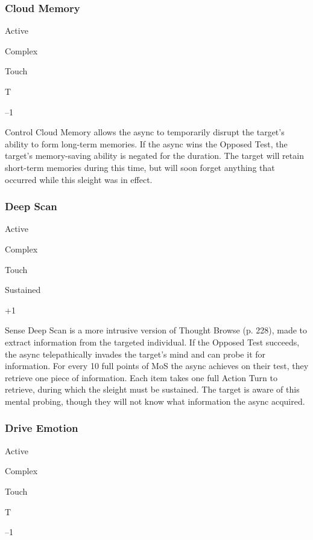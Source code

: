 \subsubsection{Cloud Memory}


  

Active

   Complex

 Touch

   T

   –1

  

Control
Cloud Memory allows the async to temporarily disrupt
the target's ability to form long-term memories. If
the async wins the Opposed Test, the target's memory-saving
ability is negated for the duration. The target
will retain short-term memories during this time, but 
will soon forget anything that occurred while this 
sleight was in effect.

\subsubsection{Deep Scan}


  

Active

   Complex

 Touch

   Sustained

   +1

  

Sense
Deep Scan is a more intrusive version of Thought 
Browse (p. 228), made to extract information from the 
targeted individual. If the Opposed Test succeeds, the 
async telepathically invades the target's mind and can 
probe it for information. For every 10 full points of MoS 
the async achieves on their test, they retrieve one piece 
of information. Each item takes one full Action Turn to 
retrieve, during which the sleight must be sustained. The 
target is aware of this mental probing, though they will 
not know what information the async acquired.

\subsubsection{Drive Emotion}


  

Active

   Complex

 Touch

   T

   –1

